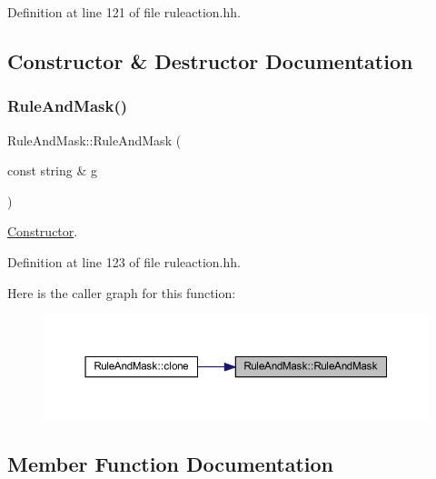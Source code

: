 Definition at line 121 of file ruleaction.\+hh.



\subsection{Constructor \& Destructor Documentation}
\mbox{\label{class_rule_and_mask_a4a3eed1a014056ce405bf553e343d42a}} 
\subsubsection{\texorpdfstring{RuleAndMask()}{RuleAndMask()}}
{\footnotesize\ttfamily Rule\+And\+Mask\+::\+Rule\+And\+Mask (\begin{DoxyParamCaption}\item[{const string \&}]{g }\end{DoxyParamCaption})\hspace{0.3cm}{\ttfamily [inline]}}



\mbox{\hyperlink{class_constructor}{Constructor}}. 



Definition at line 123 of file ruleaction.\+hh.

Here is the caller graph for this function\+:
\nopagebreak
\begin{figure}[H]
\begin{center}
\leavevmode
\includegraphics[width=350pt]{class_rule_and_mask_a4a3eed1a014056ce405bf553e343d42a_icgraph}
\end{center}
\end{figure}


\subsection{Member Function Documentation}
\mbox{\label{class_rule_and_mask_a366c5419fa1fb118d35b7f9794d72e47}} 

